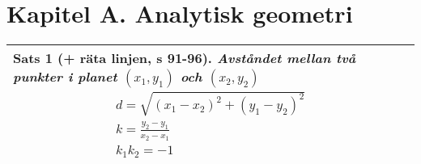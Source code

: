 \documentclass[a4paper]{article}
\begin{document}
\section*{Kapitel A. Analytisk geometri}
\begin{tabular}{|L{11.5cm}|} \hline
\textbf{Sats 1} (+ räta linjen, s 91-96).
\textit{Avståndet mellan två punkter i planet $(x_1,y_1)$ och $(x_2,y_2)$}
\begin{eqnarray}
d = \sqrt{(x_1-x_2)^2+(y_1-y_2)^2} \\
k = \frac{y_2-y_1}{x_2-x_1} \\
k_1k_2=-1
\end{eqnarray}
\vspace{0.2cm}
\\\hline
\end{tabular}
\\\\\\
\end{document}
